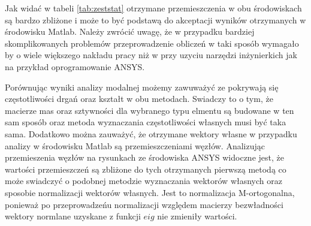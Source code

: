 \documentclass[12pt, a4papper, twoside]{article}
\begin{document}
Jak widać w tabeli \ref{tab:zeststat} otrzymane przemieszczenia w obu środowiskach są bardzo zbliżone i może to być podstawą do akceptacji wyników otrzymanych w środowisku Matlab. Należy zwrócić uwagę, że w przypadku bardziej skomplikowanych problemów przeprowadzenie obliczeń w taki sposób wymagało by o wiele większego nakładu pracy niż w przy uzyciu narzędzi inżynierkich jak na przykład oprogramowanie ANSYS.


Porównując wyniki analizy modalnej możemy zawuważyć ze pokrywają się częstotliwości drgań oraz kształt w obu metodach. Swiadczy to o tym, że macierze mas oraz sztywności dla wybranego typu elmentu są budowane w ten sam sposób oraz metoda wyznaczania częstotliwości własnych musi być taka sama.
Dodatkowo można zauważyć, że otrzymane wektory własne w przypadku analizy w środowisku Matlab są przemieszczeniami węzłów. Analizując przemieszenia węzłów na rysunkach ze środowiska ANSYS widoczne jest, że wartości przemieszczeń są zbliżone do tych otrzymanych pierwszą metodą co może swiadczyć o podobnej metodzie wyznaczania wektorów własnych oraz sposobie normalizacji wektorów własnych. Jest to normalizacja M-ortogonalna, ponieważ po przeprowadzeńu normalizacji względem macierzy bezwładności wektory normlane uzyskane z funkcji $eig$ nie zmieniły wartości.
\end{document}
